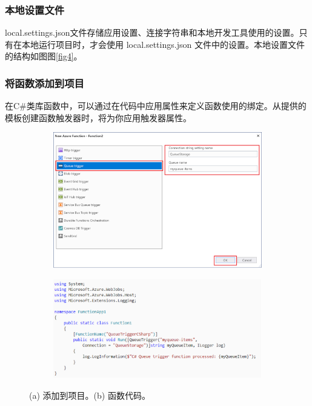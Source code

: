\subsubsection{本地设置文件} 
local.settings.json文件存储应用设置、连接字符串和本地开发工具使用的设置。只有在本地运行项目时，才会使用 local.settings.json 文件中的设置。本地设置文件的结构如图图\ref{fig4}。

\subsubsection{将函数添加到项目} 
在C\#类库函数中，可以通过在代码中应用属性来定义函数使用的绑定。从提供的模板创建函数触发器时，将为你应用触发器属性。	
\begin{figure}[!htbp]
	\begin{subfigure}[b]{0.5\linewidth}
		\includegraphics[width=\linewidth]{figs/5.png}
		\caption{}
		\label{fig5}
	\end{subfigure}
	\begin{subfigure}[b]{0.5\linewidth}
		\includegraphics[width=\linewidth]{figs/6.png}
		\caption{}
		\label{fig6}
	\end{subfigure}
	\caption{(a) 添加到项目。(b) 函数代码。}
\end{figure}
